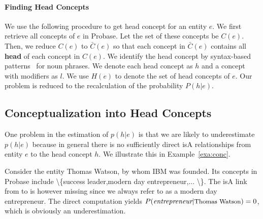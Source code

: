 \paragraph*{Finding Head Concepts}
We use the following procedure to get head concept for an entity $e$.
We first retrieve all concepts of $e$ in Probase. Let the set of these concepts be $C(e)$.
Then, we reduce $C(e)$ to $\bar{C}(e)$ so that each concept in $\bar{C}(e)$ contains all {\bf head} of each concept in $C(e)$.
We identify the head concept by syntax-based patterns~\cite{ponzetto2007deriving} for noun phrases.
We denote each head concept as $h$ and a concept with modifiers as ${l}$.
We use $H(e)$ to denote the set of head concepts of $e$.
Our problem is reduced to the recalculation of the probability $P({h}|e)$.


\subsection{Conceptualization into Head Concepts}
One problem in the estimation of $p(h|e)$ is that we are likely to underestimate $p(h|e)$ because in general there is no sufficiently direct isA relationships from entity $e$ to the head concept $h$.
We illustrate this in Example~\ref{exa:conc}.

{\footnotesize
\begin{example}[Underestimation]
\label{exa:conc}
Consider the entity \ac{Thomas Watson}, by whom \ac{IBM} was founded. Its concepts in Probase include \ac{\{success leader,modern day entrepreneur,... \}}. The isA link from  to  is however missing since we always refer to  as a modern day entrepreneur. The direct computation yields $P(\ac{entrepreneur}|\at{\text{Thomas Watson}})=0$, which is obviously an underestimation.
\end{example}
}


